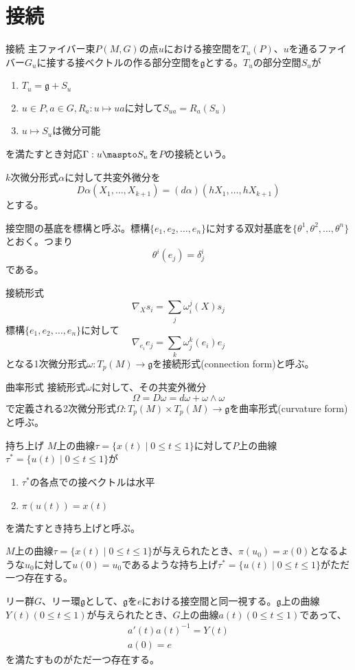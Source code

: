 \section{接続}

\begin{dfn}{接続}
	主ファイバー束$P(M, G)$の点$u$における接空間を$T_u(P)$、$u$を通るファイバー$G_u$に接する接ベクトルの作る部分空間を$\mathfrak{g}$とする。$T_u$の部分空間$S_u$が
	\begin{enumerate}
		\item $T_u = \mathfrak{g} + S_u$
		\item $u \in P, a \in G, R_a: u \mapsto ua$に対して$S_{ua} = R_a(S_u)$
		\item $u \mapsto S_u$は微分可能
	\end{enumerate}
	を満たすとき対応$\Gamma: u \maspto S_u$を$P$の接続という。
\end{dfn}

$k$次微分形式$\alpha$に対して共変外微分を
	\[D\alpha(X_1, \ldots, X_{k+1}) = (d\alpha)(hX_1, \ldots, hX_{k+1})\]
とする。

接空間の基底を標構と呼ぶ。標構$\{e_1, e_2, \dots, e_n\}$に対する双対基底を$\{\theta^1, \theta^2, \dots, \theta^n\}$とおく。つまり
	\[\theta^i(e_j) = \delta^i_j\]
である。

\begin{dfn}{接続形式}
		\[\nabla_Xs_i = \sum_j \omega^j_i(X)s_j\]
	標構$\{e_1, e_2, \dots, e_n\}$に対して
		\[\nabla_{e_i}e_j = \sum_k \omega^k_j(e_i)e_j\]
	となる1次微分形式$\omega: T_p(M) \rightarrow \mathfrak{g}$を接続形式(connection form)と呼ぶ。
\end{dfn}
\begin{dfn}{曲率形式}
	接続形式$\omega$に対して、その共変外微分
		\[\Omega = D\omega = d\omega + \omega \wedge \omega\]
	で定義される2次微分形式$\Omega: T_p(M) \times T_p(M) \rightarrow \mathfrak{g}$を曲率形式(curvature form)と呼ぶ。
\end{dfn}

\begin{dfn}{持ち上げ}
	$M$上の曲線$\tau = \{x(t) \mid 0 \leq t \leq 1\}$に対して$P$上の曲線$\tau^{*} = \{u(t) \mid 0 \leq t \leq 1\}$が
	\begin{enumerate}
		\item $\tau^{*}$の各点での接ベクトルは水平
		\item $\pi(u(t)) = x(t)$
	\end{enumerate}
	を満たすとき持ち上げと呼ぶ。
\end{dfn}
\begin{thm}
	$M$上の曲線$\tau = \{x(t) \mid 0 \leq t \leq 1\}$が与えられたとき、$\pi(u_0) = x(0)$となるような$u_0$に対して$u(0) = u_0$であるような持ち上げ$\tau^{*} = \{u(t) \mid 0 \leq t \leq 1\}$がただ一つ存在する。
\end{thm}
\begin{thm}
	リー群$G$、リー環$\mathfrak{g}$として、$\mathfrak{g}$を$e$における接空間と同一視する。$\mathfrak{g}$上の曲線$Y(t)(0 \leq t \leq 1)$が与えられたとき、$G$上の曲線$a(t)(0 \leq t \leq 1)$であって、
	\begin{align*}
		a'(t)a(t)^{-1} = Y(t)\\
		a(0) = e
	\end{align*}
	を満たすものがただ一つ存在する。
\end{thm}
